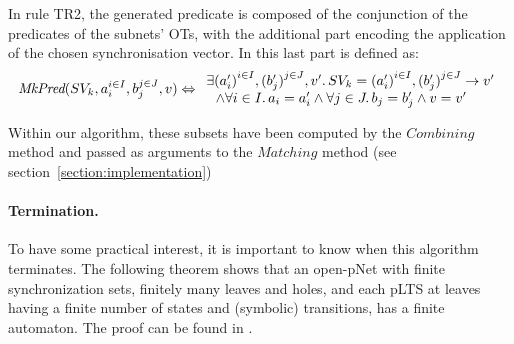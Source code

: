 \documentclass{lncs/llncs}
\newcommand{\TODO}[1]{\textcolor{red}{\textbf{[TODO:#1]}}}
\newcommand{\Pred}{\symb{Pred}}
\newcommand{\MkPred}{\symb{MkPred}}
\begin{document}
In rule TR2, the generated predicate is composed of the conjunction of
the predicates of the subnets' OTs, with the additional part encoding
the application of the chosen synchronisation vector.
In \cite{henrio:Forte2016} this last part is defined as:
\[\MkPred(SV_k, a_i^{i\in I}, b_j^{j\in J}, v)\Leftrightarrow
\begin{array}{l}
\exists {(a'_i)}^{i\in I},
{(b'_j)}^{j\in J},v'.\, SV_k={(a'_i)}^{i\in I}, {(b'_j)}^{j\in J}\rightarrow v'
\\~~\land
\forall i\in I.\, a_i=a'_i\land \forall j \in J.\, b_j=b'_j \land v=v'
\end{array}\]



Within our algorithm, these subsets have been computed by the
$Combining$ method and passed as arguments to the $Matching$ method
(see section~\ref{section:implementation}) 

\paragraph{Termination.} To have some practical interest, it is important to know when this
algorithm terminates. The following theorem shows that an open-pNet
with finite synchronization sets, finitely many leaves and
holes, and each pLTS at leaves having a finite number of states and
(symbolic) transitions, has a finite automaton. The proof can be found
in \cite{henrio:Forte2016}. 
\end{document}
